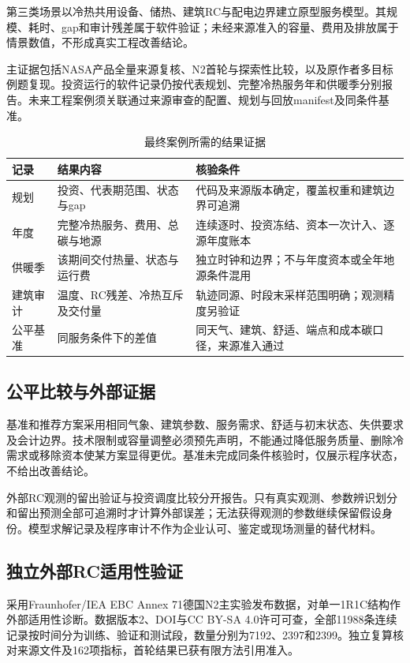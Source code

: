 第三类场景以冷热共用设备、储热、建筑RC与配电边界建立原型服务模型。其规模、耗时、gap和审计残差属于软件验证；未经来源准入的容量、费用及排放属于情景数值，不形成真实工程改善结论。

主证据包括NASA产品全量来源复核、N2首轮与探索性比较，以及原作者多目标例题复现。投资运行的软件记录仍按代表规划、完整冷热服务年和供暖季分别报告。未来工程案例须关联通过来源审查的配置、规划与回放manifest及同条件基准。

\begin{table}[H]
\centering
\caption{最终案例所需的结果证据}
\begin{tabularx}{\textwidth}{@{}p{}p{}X@{}}
\toprule
记录 & 结果内容 & 核验条件\\
\midrule
规划 & 投资、代表期范围、状态与gap & 代码及来源版本确定，覆盖权重和建筑边界可追溯\\
年度 & 完整冷热服务、费用、总碳与地源 & 连续逐时、投资冻结、资本一次计入、逐源年度账本\\
供暖季 & 该期间交付热量、状态与运行费 & 独立时钟和边界；不与年度资本或全年地源条件混用\\
建筑审计 & 温度、RC残差、冷热互斥及交付量 & 轨迹同源、时段末采样范围明确；观测精度另验证\\
公平基准 & 同服务条件下的差值 & 同天气、建筑、舒适、端点和成本碳口径，来源准入通过\\
\bottomrule
\end{tabularx}
\end{table}

\subsection{公平比较与外部证据}

基准和推荐方案采用相同气象、建筑参数、服务需求、舒适与初末状态、失供要求及会计边界。技术限制或容量调整必须预先声明，不能通过降低服务质量、删除冷需求或移除资本使某方案显得更优。基准未完成同条件核验时，仅展示程序状态，不给出改善结论。

外部RC观测的留出验证与投资调度比较分开报告。只有真实观测、参数辨识划分和留出预测全部可追溯时才计算外部误差；无法获得观测的参数继续保留假设身份。模型求解记录及程序审计不作为企业认可、鉴定或现场测量的替代材料。

\subsection{独立外部RC适用性验证}

采用Fraunhofer/IEA EBC Annex 71德国N2主实验发布数据，对单一1R1C结构作外部适用性诊断。数据版本2、DOI与CC BY-SA 4.0许可可查，全部11988条连续记录按时间分为训练、验证和测试段，数量分别为7192、2397和2399。独立复算核对来源文件及162项指标，首轮结果已获有限方法引用准入。

